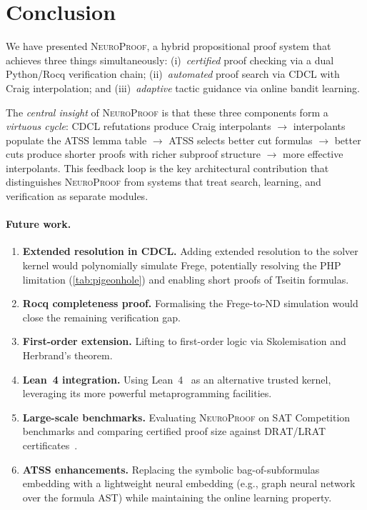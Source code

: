 \documentclass[conference]{IEEEtran}
\newcommand{\NP}{\textsc{NeuroProof}}
\begin{document}
\section{Conclusion}
\label{sec:conclusion}

We have presented \NP{}, a hybrid propositional proof system that
achieves three things simultaneously: (i)~\emph{certified} proof
checking via a dual Python/Rocq verification chain; (ii)~\emph{automated}
proof search via CDCL with Craig interpolation; and
(iii)~\emph{adaptive} tactic guidance via online bandit learning.

The \emph{central insight} of \NP{} is that these three components
form a \emph{virtuous cycle}: CDCL refutations produce Craig
interpolants $\to$ interpolants populate the ATSS lemma table
$\to$ ATSS selects better cut formulas $\to$ better cuts produce
shorter proofs with richer subproof structure $\to$ more effective
interpolants.  This feedback loop is the key architectural
contribution that distinguishes \NP{} from systems that treat
search, learning, and verification as separate modules.

\paragraph{Future work.}
\begin{enumerate}
  \item \textbf{Extended resolution in CDCL.}  Adding extended
    resolution to the solver kernel would polynomially simulate
    Frege, potentially resolving the PHP limitation
    (\cref{tab:pigeonhole}) and enabling short proofs of Tseitin
    formulas.
  \item \textbf{Rocq completeness proof.}  Formalising the
    Frege-to-ND simulation would close the remaining verification
    gap.
  \item \textbf{First-order extension.}  Lifting to first-order
    logic via Skolemisation and Herbrand's theorem.
  \item \textbf{Lean~4 integration.}  Using
    Lean~4~\cite{MouraKong2021} as an alternative trusted kernel,
    leveraging its more powerful metaprogramming facilities.
  \item \textbf{Large-scale benchmarks.}  Evaluating \NP{} on
    SAT Competition~\cite{BiereSATCompetition2024} benchmarks and
    comparing certified proof size against DRAT/LRAT
    certificates~\cite{LammichLRAT2024}.
  \item \textbf{ATSS enhancements.}  Replacing the symbolic
    bag-of-subformulas embedding with a lightweight neural
    embedding (e.g., graph neural network over the formula AST)
    while maintaining the online learning property.
\end{enumerate}
\end{document}
